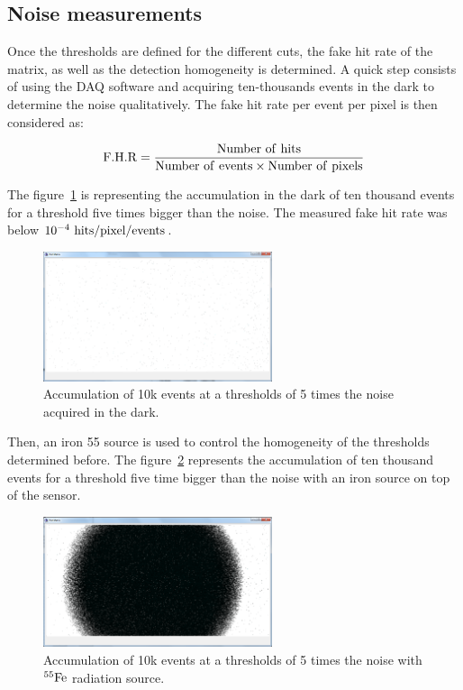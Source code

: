   \subsection{Noise measurements}

  Once the thresholds are defined for the different cuts, the fake hit rate of the matrix, as well as the detection homogeneity is determined.
  A quick step consists of using the DAQ software and acquiring ten-thousands events in the dark to determine the noise qualitatively. 
  The fake hit rate per event per pixel is then considered as:

  \begin{equation}
    \rm{F.H.R} = \frac{\rm{Number~of~hits}}{\rm{Number~of~events} \times \rm{Number~of~pixels}} 
  \end{equation}
  
  The figure~\ref{fig:darkEvents} is representing the accumulation in the dark of ten thousand events for a threshold five times bigger than the noise.
  The measured fake hit rate was below $10^{-4}~\rm{hits/pixel/events}$.

   \begin{figure}[!h]
    \centering
    \includegraphics[width=0.6\textwidth]{Pictures/labTests/dark_10kEvents_not_noisy.png}
    \caption{Accumulation of 10k events at a thresholds of 5 times the noise acquired in the dark.}
    \label{fig:darkEvents}
  \end{figure}

  Then, an iron 55 source is used to control the homogeneity of the thresholds determined before.
  The figure~\ref{fig:fe55} represents the accumulation of ten thousand events for a threshold five time bigger than the noise with an iron source on top of the sensor.
  
  \begin{figure}[!h]
    \centering
    \includegraphics[width=0.6\textwidth]{Pictures/labTests/10kEvents_Fe55_cut5sigma.png}
    \caption{Accumulation of 10k events at a thresholds of 5 times the noise with $^{55}\rm{Fe}$ radiation source.}
    \label{fig:fe55}
  \end{figure}

